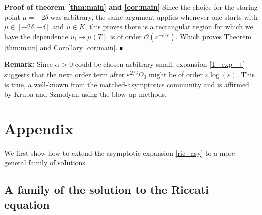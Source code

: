 \documentclass[letterpaper,11pt]{article}
\newcommand{\rmO}{\mathcal{O}}
\newcommand{\eps}{\varepsilon}
\numberwithin{equation}{section}
\theoremstyle{plain}
\newenvironment{Proof}[1][.]%
 {\begin{trivlist}\item[]\textbf{Proof#1 }}%
 {\hspace*{\fill}$\rule{0.3\baselineskip}{0.35\baselineskip}$\end{trivlist}}
\begin{document}
\begin{Proof}[\textbf{ of theorem \ref{thm:main} and \ref{cor:main}}]
Since the choice for the staring point $\mu = -2\delta$ was arbitrary, the same argument applies whenever one starts with $\mu \in [-2\delta, -\delta]$ and $u \in K$, this proves there is a rectangular region for which we have the dependence $u_i \mapsto \mu(T)$ is of order $\rmO(\eps^{-c/\eps})$. Which proves Theorem \ref{thm:main} and Corollary \ref{cor:main}.
\end{Proof}

\textbf{Remark:} Since $\alpha>0$ could be chosen arbitrary small, expansion \eqref{T_exp_+} suggests that the next order term after $\eps^{2/3}\Omega_0$ might be of order $\eps \log(\eps)$. This is true, a well-known from the matched-asymptotics community and is affirmed by Krupa and Szmolyan using the blow-up methods. 
\pagebreak
\section*{Appendix}
\renewcommand{\thesubsection}{\Alph{subsection}}
We first show how to extend the asymptotic expansion \eqref{ric_asy} to a more general family of solutions.
\subsection{A family of the solution to the Riccati equation }
\end{document}
